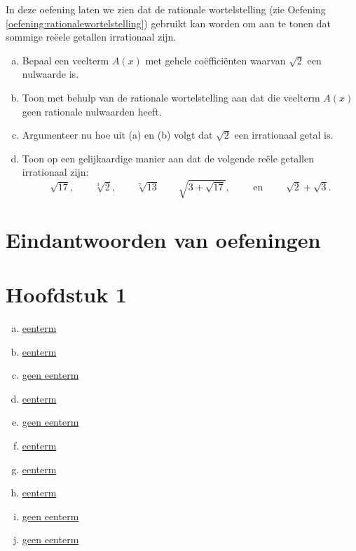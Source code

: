 \documentclass{ximera}
\begin{document}
\begin{Uitbreiding}
\begin{exercise} 
In deze oefening laten we zien dat de rationale wortelstelling (zie Oefening \ref{oefening:rationalewortelstelling}) gebruikt kan worden om aan te tonen dat sommige re\"eele getallen irrationaal zijn.
\begin{enumerate}[(a)]
\item
Bepaal een veelterm $A(x)$ met gehele co\"effici\"enten waarvan $\sqrt{2}$ een nulwaarde is.
\item
Toon met behulp van de rationale wortelstelling aan dat die veelterm $A(x)$ geen rationale nulwaarden heeft.
\item
Argumenteer nu hoe uit (a) en (b) volgt dat $\sqrt{2}$ een irrationaal getal is.
\item
Toon op een gelijkaardige manier aan dat de volgende re\"ele getallen irrationaal zijn:
\[
\sqrt{17}, \qquad \sqrt[3]{2}, \qquad \sqrt[7]{13} \qquad \sqrt{3+\sqrt{17}}, 
\qquad \text{ en } \qquad \sqrt{2}+\sqrt{3}.
\]
\end{enumerate}
\end{exercise} 
\end{Uitbreiding}



\section{Eindantwoorden van oefeningen}
\section*{Hoofdstuk 1}

\begin{oplossing} 
\begin{enumerate}[(a)]
\item
\hyperlink{oef1.1}{eenterm}
\item
\hyperlink{oef1.1}{eenterm}
\item
\hyperlink{oef1.1}{geen eenterm}
\item
\hyperlink{oef1.1}{eenterm}
\item
\hyperlink{oef1.1}{geen eenterm}
\item
\hyperlink{oef1.1}{eenterm}
\item\hyperlink{oef1.1}{eenterm}
\item
\hyperlink{oef1.1}{eenterm}
\item
\hyperlink{oef1.1}{geen eenterm}
\item
\hyperlink{oef1.1}{geen eenterm}
\end{enumerate}
\end{oplossing} 
\end{document}

